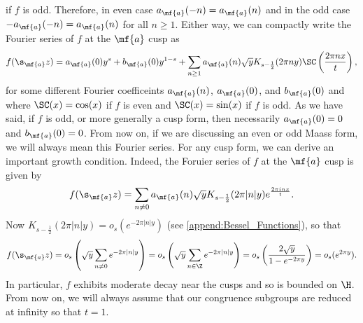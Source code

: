     if $f$ is odd. Therefore, in even case $a_{\mf{a}}(-n) = a_{\mf{a}}(n)$ and in the odd case $-a_{\mf{a}}(-n) = a_{\mf{a}}(n)$ for all $n \ge 1$. Either way, we can compactly write the Fourier series of $f$ at the $\mf{a}$ cusp as
    \[
      f(\s_{\mf{a}}z) = a_{\mf{a}}(0)y^{s}+b_{\mf{a}}(0)y^{1-s}+\sum_{n \ge 1}a_{\mf{a}}(n)\sqrt{y}K_{s-\frac{1}{2}}(2\pi ny)\SC\left(\frac{2\pi nx}{t}\right),
    \]
    for some different Fourier coefficeints $a_{\mf{a}}(n)$, $a_{\mf{a}}(0)$, and $b_{\mf{a}}(0)$ and where $\SC(x) = \cos(x)$ if $f$ is even and $\SC(x) = \sin(x)$ if $f$ is odd. As we have said, if $f$ is odd, or more generally a cusp form, then necessarily $a_{\mf{a}}(0) = 0$ and $b_{\mf{a}}(0) = 0$. From now on, if we are discussing an even or odd Maass form, we will always mean this Fourier series. For any cusp form, we can derive an important growth condition. Indeed, the Foruier series of $f$ at the $\mf{a}$ cusp is given by
    \[
      f(\s_{\mf{a}}z) = \sum_{n \neq 0}a_{\mf{a}}(n)\sqrt{y}K_{s-\frac{1}{2}}(2\pi|n|y)e^{\frac{2\pi inx}{t}}.
    \]
    Now $K_{s-\frac{1}{2}}(2\pi|n|y) = o_{s}(e^{-2\pi|n|y})$ (see \cref{append:Bessel_Functions}), so that
    \[
      f(\s_{\mf{a}}z) = o_{s}\left(\sqrt{y}\sum_{n \neq 0}e^{-2\pi|n|y}\right) = o_{s}\left(\sqrt{y}\sum_{n \in \Z}e^{-2\pi|n|y}\right) = o_{s}\left(\frac{2\sqrt{y}}{1-e^{-2\pi y}}\right) = o_{s}(e^{2\pi y}).
    \]
    In particular, $f$ exhibits moderate decay near the cusps and so is bounded on $\H$. From now on, we will always assume that our congruence subgroups are reduced at infinity so that $t = 1$.
